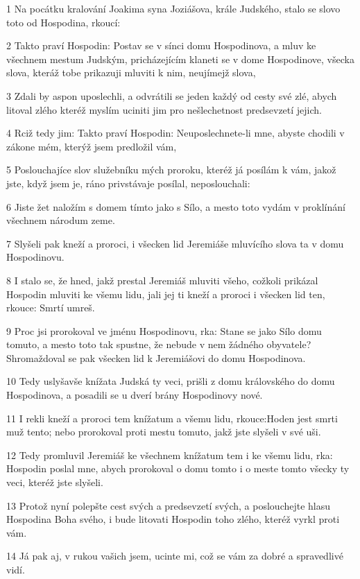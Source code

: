 \par 1 Na pocátku kralování Joakima syna Joziášova, krále Judského, stalo se slovo toto od Hospodina, rkoucí:
\par 2 Takto praví Hospodin: Postav se v sínci domu Hospodinova, a mluv ke všechnem mestum Judským, pricházejícím klaneti se v dome Hospodinove, všecka slova, kteráž tobe prikazuji mluviti k nim, neujímejž slova,
\par 3 Zdali by aspon uposlechli, a odvrátili se jeden každý od cesty své zlé, abych litoval zlého kteréž myslím uciniti jim pro nešlechetnost predsevzetí jejich.
\par 4 Rciž tedy jim: Takto praví Hospodin: Neuposlechnete-li mne, abyste chodili v zákone mém, kterýž jsem predložil vám,
\par 5 Poslouchajíce slov služebníku mých proroku, kteréž já posílám k vám, jakož jste, když jsem je, ráno privstávaje posílal, neposlouchali:
\par 6 Jiste žet naložím s domem tímto jako s Sílo, a mesto toto vydám v proklínání všechnem národum zeme.
\par 7 Slyšeli pak kneží a proroci, i všecken lid Jeremiáše mluvícího slova ta v domu Hospodinovu.
\par 8 I stalo se, že hned, jakž prestal Jeremiáš mluviti všeho, cožkoli prikázal Hospodin mluviti ke všemu lidu, jali jej ti kneží a proroci i všecken lid ten, rkouce: Smrtí umreš.
\par 9 Proc jsi prorokoval ve jménu Hospodinovu, rka: Stane se jako Sílo domu tomuto, a mesto toto tak spustne, že nebude v nem žádného obyvatele? Shromaždoval se pak všecken lid k Jeremiášovi do domu Hospodinova.
\par 10 Tedy uslyšavše knížata Judská ty veci, prišli z domu královského do domu Hospodinova, a posadili se u dverí brány Hospodinovy nové.
\par 11 I rekli kneží a proroci tem knížatum a všemu lidu, rkouce:Hoden jest smrti muž tento; nebo prorokoval proti mestu tomuto, jakž jste slyšeli v své uši.
\par 12 Tedy promluvil Jeremiáš ke všechnem knížatum tem i ke všemu lidu, rka: Hospodin poslal mne, abych prorokoval o domu tomto i o meste tomto všecky ty veci, kteréž jste slyšeli.
\par 13 Protož nyní polepšte cest svých a predsevzetí svých, a poslouchejte hlasu Hospodina Boha svého, i bude litovati Hospodin toho zlého, kteréž vyrkl proti vám.
\par 14 Já pak aj, v rukou vašich jsem, ucinte mi, což se vám za dobré a spravedlivé vidí.
